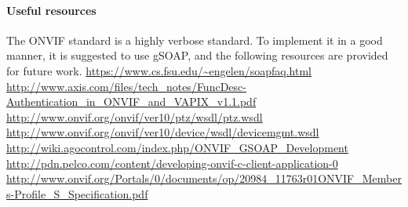 \paragraph{Useful resources} The ONVIF standard is a highly verbose standard. To implement it in a good manner, it is suggested to use gSOAP, and the following resources are provided for future work.
\url{https://www.cs.fsu.edu/~engelen/soapfaq.html}
\url{http://www.axis.com/files/tech_notes/FuncDesc-Authentication_in_ONVIF_and_VAPIX_v1.1.pdf}
\url{http://www.onvif.org/onvif/ver10/ptz/wsdl/ptz.wsdl}
\url{http://www.onvif.org/onvif/ver10/device/wsdl/devicemgmt.wsdl}
\url{http://wiki.agocontrol.com/index.php/ONVIF_GSOAP_Development}
\url{http://pdn.pelco.com/content/developing-onvif-c-client-application-0}
\url{http://www.onvif.org/Portals/0/documents/op/20984_11763r01ONVIF_Members-Profile_S_Specification.pdf}